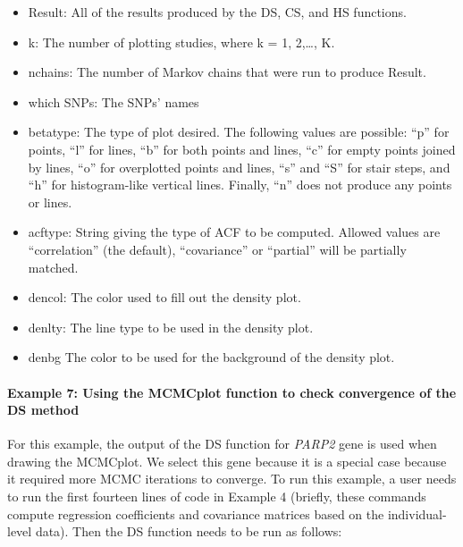 \begin{itemize}
\item
  Result: All of the results produced by the DS, CS, and HS functions.
\item
  k: The number of plotting studies, where k = 1, 2,\ldots, K.
\item
  nchains: The number of Markov chains that were run to produce Result.
\item
  which SNPs: The SNPs' names
\item
  betatype: The type of plot desired. The following values are possible: ``p'' for points, ``l'' for lines, ``b'' for both points and lines, ``c'' for empty points joined by lines, ``o'' for overplotted points and lines, ``s'' and ``S'' for stair steps, and ``h'' for histogram-like vertical lines. Finally, ``n'' does not produce any points or lines.
\item
  acftype: String giving the type of ACF to be computed. Allowed values are ``correlation'' (the default), ``covariance'' or ``partial'' will be partially matched.
\item
  dencol: The color used to fill out the density plot.
\item
  denlty: The line type to be used in the density plot.
\item
  denbg The color to be used for the background of the density plot.
\end{itemize}

\hypertarget{example-7-using-the-mcmcplot-function-to-check-convergence-of-the-ds-method}{%
\paragraph{Example 7: Using the MCMCplot function to check convergence of the DS method}\label{example-7-using-the-mcmcplot-function-to-check-convergence-of-the-ds-method}}

For this example, the output of the DS function for \emph{PARP2} gene is used when drawing the MCMCplot. We select this gene because it is a special case because it required more MCMC iterations to converge.
To run this example, a user needs to run the first fourteen lines of code in Example 4 (briefly, these commands compute regression coefficients and covariance matrices based on the individual-level data).
Then the DS function needs to be run as follows:

